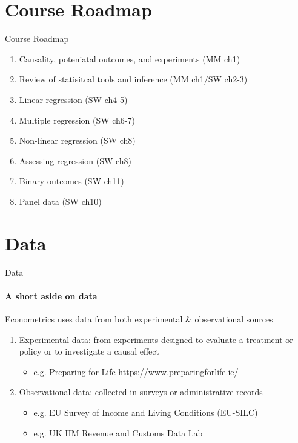 \documentclass[11pt,english]{beamer}
\begin{document}
\section{Course Roadmap}
\begin{frame}{Course Roadmap}
	\subtitle{Where we're going}

	\begin{enumerate}
		\item Causality, poteniatal outcomes, and experiments (MM ch1)
		\item Review of statisitcal tools and inference (MM ch1/SW ch2-3)
		\item Linear regression (SW ch4-5)
		\item Multiple regression (SW ch6-7)
		\item Non-linear regression (SW ch8)
		\item Assessing regression (SW ch8)
		\item Binary outcomes (SW ch11)
		\item Panel data (SW ch10)
	\end{enumerate}

\end{frame}

\section{Data}

\begin{frame}{Data}
\framesubtitle{A short aside on data}
	\pause 
	Econometrics uses data from both experimental \& observational sources \pause 
	\begin{enumerate}
		\item Experimental data: from experiments designed to evaluate a treatment or policy or to investigate a causal effect
		\begin{itemize}
			\item e.g. Preparing for Life https://www.preparingforlife.ie/ 
		\end{itemize}
		\pause 
		
		\item Observational data: collected in surveys or administrative records
		\begin{itemize}
			\item e.g. EU Survey of Income and Living Conditions (EU-SILC)
			\item e.g. UK HM Revenue and Customs Data Lab 
		\end{itemize}	
	\end{enumerate}
\end{frame}
\end{document}
